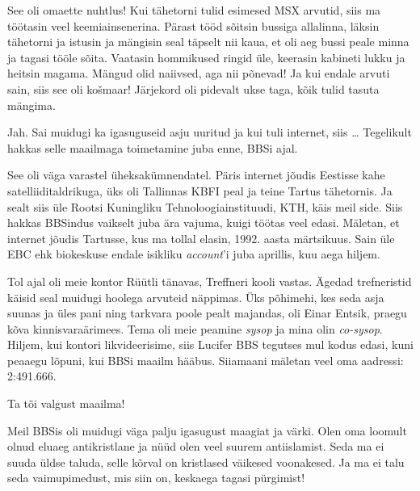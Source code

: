 See oli omaette nuhtlus! Kui tähetorni 
tulid esimesed MSX arvutid, siis ma töötasin veel
keemiainsenerina. Pärast tööd sõitsin bussiga allalinna, läksin tähetorni ja 
istusin ja mängisin seal täpselt nii kaua, et oli aeg bussi peale minna ja 
tagasi tööle sõita. Vaatasin hommikused ringid üle, keerasin kabineti lukku ja heitsin
magama. Mängud olid naiivsed, aga nii põnevad! Ja kui endale 
arvuti sain, siis see oli košmaar! Järjekord oli pidevalt ukse taga, kõik tulid 
tasuta mängima. 

Jah. Sai muidugi ka igasuguseid asju uuritud ja kui tuli internet, siis \ldots{ }
Tegelikult hakkas selle maailmaga toimetamine juba enne, BBSi ajal.


See oli väga varastel üheksakümnendatel. Päris internet jõudis Eestisse 
kahe satelliiditaldrikuga, üks oli Tallinnas KBFI peal ja teine Tartus 
tähetornis. Ja sealt siis üle Rootsi Kuningliku 
Tehnoloogiainstituudi, KTH, käis meil 
side. Siis hakkas BBSindus vaikselt juba ära vajuma, kuigi töötas veel 
edasi. Mäletan, et internet jõudis Tartusse, kus ma tollal elasin, 
1992. aasta märtsikuus. Sain üle EBC ehk biokeskuse endale 
isikliku \emph{account}'i juba aprillis, kuu aega hiljem.

Tol ajal oli meie kontor Rüütli tänavas, Treffneri kooli vastas. Ägedad trefneristid käisid seal muidugi 
hoolega arvuteid näppimas. Üks põhimehi, kes seda asja suunas ja üles pani ning tarkvara poole pealt
majandas, oli Einar Entsik, 
praegu kõva kinnisvaraärimees. Tema oli meie peamine \emph{sysop} ja mina 
olin \emph{co-sysop}. Hiljem, kui kontori likvideerisime, siis Lucifer 
BBS tegutses mul kodus edasi, kuni peaaegu lõpuni, kui 
BBSi maailm hääbus. Siiamaani mäletan veel oma aadressi: 2:491.666.


Ta tõi valgust maailma! 

Meil BBSis oli muidugi väga palju igasugust maagiat ja värki. Olen oma 
loomult olnud eluaeg antikristlane ja nüüd olen veel suurem 
antiislamist. Seda ma ei suuda üldse taluda, selle kõrval on kristlased 
väikesed voonakesed. Ja ma ei talu seda vaimupimedust, mis siin on, keskaega tagasi pürgimist! 

